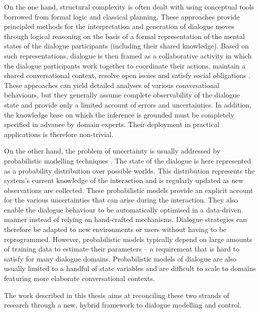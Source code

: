 On the one hand, structural complexity is often dealt with using conceptual tools borrowed from formal logic and classical planning.  These approaches provide principled methods for the interpretation and generation of dialogue moves through logical reasoning on the basis of a formal representation of the mental states of the dialogue participants (including their shared knowledge). Based on such representations, dialogue is then framed as a collaborative activity in which the dialogue participants work together to coordinate their actions, maintain a shared conversational context, resolve open issues and satisfy social obligations  \citep{Allen:2000:AGD:973935.973937,larsson2002,Jokinen:2009}. These approaches can yield detailed analyses of various conversational behaviours, but they generally assume complete observability of the dialogue state and provide only a limited account of errors and uncertainties. In addition, the knowledge base on which the inference is grounded must be completely specified in advance by domain experts.  Their deployment in practical applications is therefore non-trivial. 

On the other hand, the problem of uncertainty is usually addressed by probabilistic modelling techniques \citep{Roy:2000,FramptonL09,Young:2010}.  The state of the dialogue is here represented as a probability distribution over possible worlds.  This distribution represents the system's current knowledge of the interaction and is regularly updated as new observations are collected. These probabilistic models provide an explicit account for the various uncertainties that can arise during the interaction. They also enable the dialogue behaviour to be automatically optimised in a data-driven manner instead of relying on hand-crafted mechanisms.  Dialogue strategies can therefore be adapted to new environments or users without having to be reprogrammed. However, probabilistic models typically depend on large amounts of training data to estimate their parameters -- a requirement that is hard to satisfy for many dialogue domains.  Probabilistic models of dialogue are also usually limited to a handful of state variables and are difficult to scale to domains featuring more elaborate conversational contexts. 

The work described in this thesis aims at reconciling these two strands of research through a new, hybrid framework to dialogue modelling and control. 


